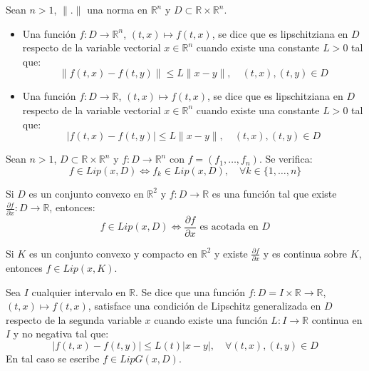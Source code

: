 \begin{definition}
    Sean $n > 1$, $\|.\|$ una norma en $\mathbb{R}^n$ y $D \subset \mathbb{R} \times \mathbb{R}^n$.
    \begin{itemize}
        \item Una función $f: D \to \mathbb{R}^n$, $(t, x) \mapsto f(t, x)$, se dice que es lipschitziana en $D$ respecto de la variable vectorial $x \in \mathbb{R}^n$ cuando existe una constante $L > 0$ tal que:
              $$\|f(t, x) - f(t, y)\| \leq L\|x-y\|, \quad (t, x), (t, y) \in D$$
        \item Una función $f: D \to \mathbb{R}$, $(t, x) \mapsto f(t, x)$, se dice que es lipschitziana en $D$ respecto de la variable vectorial $x \in \mathbb{R}^n$ cuando existe una constante $L > 0$ tal que:
              $$|f(t, x) - f(t, y)| \leq L\|x-y\|, \quad (t, x), (t, y) \in D$$
    \end{itemize}
\end{definition}

\begin{proposition}
    Sean $n > 1$, $D \subset \mathbb{R} \times \mathbb{R}^n$ y $f: D \to \mathbb{R}^n$ con $f = (f_1, \dots, f_n)$.
    Se verifica:
    $$f \in Lip(x, D) \Leftrightarrow f_k \in Lip(x, D), \quad \forall k \in \{1, \dots, n\}$$
\end{proposition}

\begin{proposition}
    Si $D$ es un conjunto convexo en $\mathbb{R}^2$ y $f: D \to \mathbb{R}$ es una función tal que existe $\frac{\partial f}{\partial x}: D \to \mathbb{R}$, entonces:
    $$f \in Lip(x, D) \Leftrightarrow \frac{\partial f}{\partial x} \text{ es acotada en } D$$
\end{proposition}

\begin{remark}
    Si $K$ es un conjunto convexo y compacto en $\mathbb{R}^2$ y existe $\frac{\partial f}{\partial x}$ y es continua sobre $K$, entonces $f \in Lip(x, K)$.
\end{remark}

\begin{definition}
    Sea $I$ cualquier intervalo en $\mathbb{R}$.
    Se dice que una función $f: D = I \times \mathbb{R} \to \mathbb{R}$, $(t, x) \mapsto f(t, x)$, satisface una condición de Lipschitz generalizada en $D$ respecto de la segunda variable $x$ cuando existe una función $L: I \to \mathbb{R}$ continua en $I$ y no negativa tal que:
    $$|f(t, x) - f(t, y)| \leq L(t) |x-y|, \quad \forall (t, x), (t, y) \in D$$
    En tal caso se escribe $f \in LipG(x, D)$.
\end{definition}

